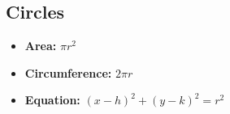 \subsection{Circles}

\begin{itemize}
    \item \textbf{Area: } $\pi r^2$
    \item \textbf{Circumference: }$2 \pi r$
    \item \textbf{Equation: } $(x-h)^2 + (y-k)^2 = r^2$
\end{itemize}